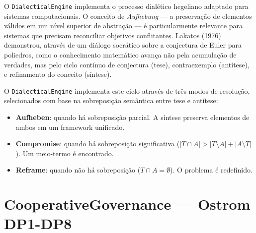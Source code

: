 O \texttt{DialecticalEngine} implementa o processo dialético hegeliano adaptado para sistemas computacionais. O conceito de \textit{Aufhebung} — a preservação de elementos válidos em um nível superior de abstração — é particularmente relevante para sistemas que precisam reconciliar objetivos conflitantes. Lakatos (1976) demonstrou, através de um diálogo socrático sobre a conjectura de Euler para poliedros, como o conhecimento matemático avança não pela acumulação de verdades, mas pelo ciclo contínuo de conjectura (tese), contraexemplo (antítese), e refinamento do conceito (síntese).

O \texttt{DialecticalEngine} implementa este ciclo através de três modos de resolução, selecionados com base na sobreposição semântica entre tese e antítese:

\begin{itemize}
    \item \textbf{Aufheben}: quando há sobreposição parcial. A síntese preserva elementos de ambos em um framework unificado.
    \item \textbf{Compromise}: quando há sobreposição significativa ($|T \cap A| > |T \setminus A| + |A \setminus T|$). Um meio-termo é encontrado.
    \item \textbf{Reframe}: quando não há sobreposição ($T \cap A = \emptyset$). O problema é redefinido.
\end{itemize}

\section{CooperativeGovernance — Ostrom DP1-DP8}

